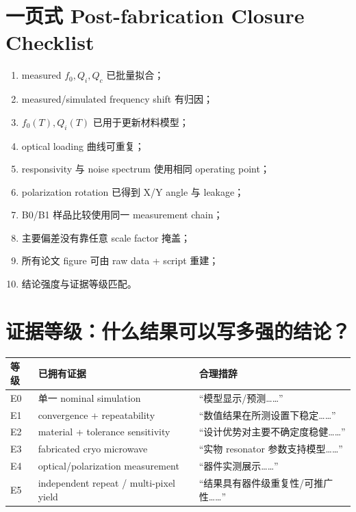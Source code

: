 \documentclass[11pt,a4paper,openany]{ctexrep}
\begin{document}
\section{一页式 Post-fabrication Closure Checklist}

\begin{notebookbox}[title=Post-fabrication closure]
\begin{enumerate}
  \item[$\square$] measured $f_0,Q_i,Q_c$ 已批量拟合；
  \item[$\square$] measured/simulated frequency shift 有归因；
  \item[$\square$] $f_0(T),Q_i(T)$ 已用于更新材料模型；
  \item[$\square$] optical loading 曲线可重复；
  \item[$\square$] responsivity 与 noise spectrum 使用相同 operating point；
  \item[$\square$] polarization rotation 已得到 X/Y angle 与 leakage；
  \item[$\square$] B0/B1 样品比较使用同一 measurement chain；
  \item[$\square$] 主要偏差没有靠任意 scale factor 掩盖；
  \item[$\square$] 所有论文 figure 可由 raw data + script 重建；
  \item[$\square$] 结论强度与证据等级匹配。
\end{enumerate}
\end{notebookbox}

\section{证据等级：什么结果可以写多强的结论？}

\begin{center}
\noindent\begin{tabularx}{\textwidth}{p{2cm}X X}
\toprule
等级 & 已拥有证据 & 合理措辞 \\
\midrule
E0 & 单一 nominal simulation & ``模型显示/预测……'' \\
E1 & convergence + repeatability & ``数值结果在所测设置下稳定……'' \\
E2 & material + tolerance sensitivity & ``设计优势对主要不确定度稳健……'' \\
E3 & fabricated cryo microwave & ``实物 resonator 参数支持模型……'' \\
E4 & optical/polarization measurement & ``器件实测展示……'' \\
E5 & independent repeat / multi-pixel yield & ``结果具有器件级重复性/可推广性……'' \\
\bottomrule
\end{tabularx}
\end{center}
\end{document}

